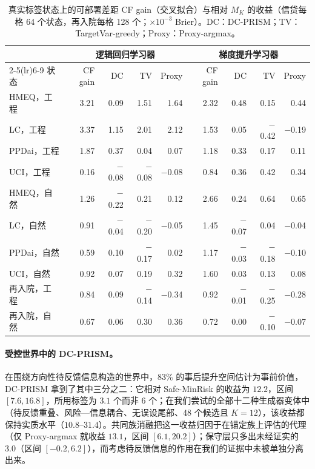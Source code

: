 \documentclass[runningheads]{llncs}
\begin{document}
\begin{table}[t]
\caption{真实标签状态上的可部署差距 CF gain（交叉拟合）与相对 $M_K$ 的收益（信贷每格 64 个状态，再入院每格 128 个；$\times10^{-3}$ Brier）。DC：DC-PRISM；TV：TargetVar-greedy；Proxy：Proxy-argmax。}
\label{tab:who}
\centering\scriptsize
\setlength{\tabcolsep}{3pt}
\begin{tabular}{lrrrrrrrr}
\toprule
& \multicolumn{4}{c}{逻辑回归学习器} & \multicolumn{4}{c}{梯度提升学习器} \\
\cmidrule(lr){2-5}\cmidrule(lr){6-9}
状态 & CF gain & DC & TV & Proxy & CF gain & DC & TV & Proxy \\
\midrule
HMEQ，工程 & 3.21 & 0.09 & 1.51 & 1.64 & 2.32 & 0.48 & 0.15 & 0.44 \\
LC，工程 & 3.37 & 1.15 & 2.01 & 2.12 & 1.53 & 0.05 & $-$0.42 & $-$0.19 \\
PPDai，工程 & 1.87 & 0.37 & 0.04 & 0.07 & 1.18 & 0.33 & 0.17 & 0.11 \\
UCI，工程 & 0.16 & $-$0.08 & $-$0.08 & $-$0.08 & 0.84 & 0.36 & 0.42 & 0.34 \\
HMEQ，自然 & 1.26 & $-$0.22 & 0.21 & 0.12 & 2.66 & 0.24 & 0.64 & 0.65 \\
LC，自然 & 0.91 & $-$0.04 & $-$0.20 & $-$0.05 & 1.45 & $-$0.07 & 0.04 & $-$0.04 \\
PPDai，自然 & 0.59 & 0.10 & $-$0.17 & 0.02 & 1.17 & $-$0.03 & $-$0.18 & $-$0.10 \\
UCI，自然 & 0.92 & 0.07 & 0.19 & 0.32 & 1.60 & 0.03 & 0.13 & 0.08 \\
再入院，工程 & 0.84 & 0.09 & $-$0.14 & $-$0.34 & 0.92 & $-$0.01 & $-$0.25 & $-$0.28 \\
再入院，自然 & 0.67 & 0.06 & 0.30 & 0.36 & 0.72 & 0.00 & $-$0.10 & $-$0.07 \\
\bottomrule
\end{tabular}
\end{table}

\paragraph{受控世界中的 DC-PRISM。}在围绕方向性待反馈信息构造的世界中，83\% 的事后提升空间估计为事前价值，DC-PRISM 拿到了其中三分之二：它相对 Safe-MinRisk 的收益为 $12.2$，区间 $[7.6,16.8]$，所用标签为 $3.1$ 个而非 6 个；在我们尝试的全部十二种生成器变体中（待反馈重叠、风险—信息耦合、无误设尾部、48 个候选且 $K=12$），该收益都保持实质水平（$10.8$--$31.4$）。共同族消融把这一收益归因于在锚定族上评估的代理（仅 Proxy-argmax 就收益 $13.1$，区间 $[6.1,20.2]$）；保守层只多出未经证实的 $3.0$（区间 $[-0.2,6.2]$），而考虑待反馈信息的作用在我们的证据中未被单独分离出来。
\end{document}
